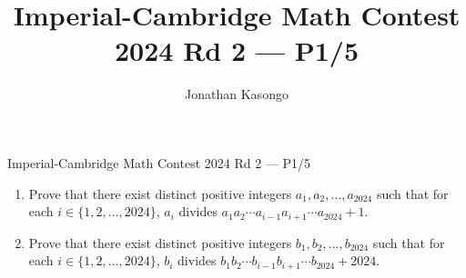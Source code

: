 \documentclass{article}
\author{Jonathan Kasongo}
\title{Imperial-Cambridge Math Contest 2024 Rd 2 --- P1/5}
\begin{document}
\maketitle

\begin{problem}{Imperial-Cambridge Math Contest 2024 Rd 2 --- P1/5}
\begin{enumerate}[label=(\alph*)]
\item Prove that there exist distinct positive integers $a_1, a_2,
\ldots, a_{2024}$ such that for each $i \in \{1,2,\ldots, 2024\}$,
$a_i$ divides $a_1 a_2 \cdots a_{i-1}a_{i+1} \cdots a_{2024} + 1$.
\item Prove that there exist distinct positive integers $b_1, b_2,
\ldots, b_{2024}$ such that for each $i \in \{1,2,\ldots, 2024\}$,
$b_i$ divides $b_1 b_2 \cdots b_{i-1}b_{i+1} \cdots b_{2024} + 2024$.
\end{enumerate}
\end{problem}
\end{document}
